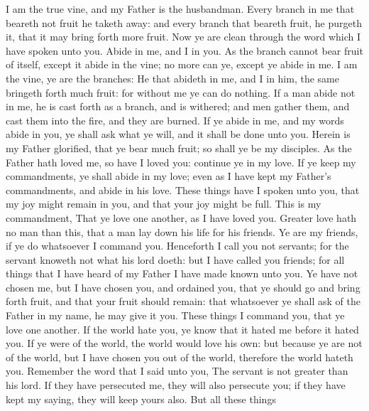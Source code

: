  I am the true vine, and my Father is the husbandman.
 Every branch in me that beareth not fruit he taketh away:
and every branch that beareth fruit, he purgeth it, that it may bring
forth more fruit.  Now ye are clean through the word which
I have spoken unto you.  Abide in me, and I in you. As the
branch cannot bear fruit of itself, except it abide in the vine; no more
can ye, except ye abide in me.  I am the vine, ye are the
branches: He that abideth in me, and I in him, the same bringeth forth
much fruit: for without me ye can do nothing.  If a man
abide not in me, he is cast forth as a branch, and is withered; and men
gather them, and cast them into the fire, and they are burned.
 If ye abide in me, and my words abide in you, ye shall
ask what ye will, and it shall be done unto you.  Herein
is my Father glorified, that ye bear much fruit; so shall ye be my
disciples.  As the Father hath loved me, so have I loved
you: continue ye in my love.  If ye keep my commandments,
ye shall abide in my love; even as I have kept my Father's commandments,
and abide in his love.  These things have I spoken unto
you, that my joy might remain in you, and that your joy might be full.
 This is my commandment, That ye love one another, as I
have loved you.  Greater love hath no man than this, that
a man lay down his life for his friends.  Ye are my
friends, if ye do whatsoever I command you.  Henceforth I
call you not servants; for the servant knoweth not what his lord doeth:
but I have called you friends; for all things that I have heard of my
Father I have made known unto you.  Ye have not chosen
me, but I have chosen you, and ordained you, that ye should go and bring
forth fruit, and that your fruit should remain: that whatsoever ye shall
ask of the Father in my name, he may give it you.  These
things I command you, that ye love one another.  If the
world hate you, ye know that it hated me before it hated you.
 If ye were of the world, the world would love his own:
but because ye are not of the world, but I have chosen you out of the
world, therefore the world hateth you.  Remember the word
that I said unto you, The servant is not greater than his lord. If they
have persecuted me, they will also persecute you; if they have kept my
saying, they will keep yours also.  But all these things
